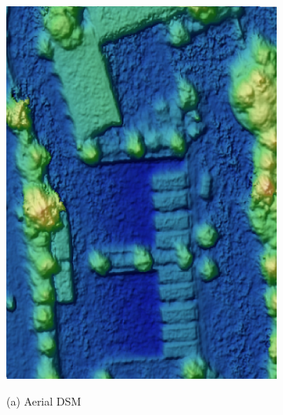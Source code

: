 \begin{figure}[tbp]
    \centering
       \begin{subfigure}[b]{0.3\columnwidth}
           \centering
           \includegraphics[width=\textwidth]{figures_5/germering_dsm_aerial.jpg}
           {{\small }}    
           \centerline{\small{(a) Aerial DSM}}\medskip
       \end{subfigure}
       \hfill
       \begin{subfigure}[b]{0.3\columnwidth}  
           \centering 

\end{subfigure}
\end{figure}
